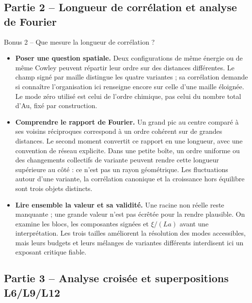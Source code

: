 \documentclass[10pt,a4paper]{article}
\begin{document}
\subsection{Partie 2 -- Longueur de corrélation et analyse de Fourier}
\begin{oral}{Bonus 2 -- Que mesure la longueur de corrélation ?}
\begin{itemize}
\item \textbf{Poser une question spatiale.} Deux configurations de même
énergie ou de même Cowley peuvent répartir leur ordre sur des distances
différentes. Le champ signé par maille distingue les quatre variantes ;
sa corrélation demande si connaître l'organisation ici renseigne encore
sur celle d'une maille éloignée. Le mode zéro utilisé est celui de
l'ordre chimique, pas celui du nombre total d'Au, fixé par construction.
\item \textbf{Comprendre le rapport de Fourier.} Un grand pic au centre
comparé à ses voisins réciproques correspond à un ordre cohérent sur
de grandes distances. Le second moment convertit ce rapport en une
longueur, avec une convention de réseau explicite. Dans une petite
boîte, un ordre uniforme ou des changements collectifs de variante
peuvent rendre cette longueur supérieure au côté : ce n'est pas un
rayon géométrique. Les fluctuations autour d'une variante, la corrélation
canonique et la croissance hors équilibre sont trois objets distincts.
\item \textbf{Lire ensemble la valeur et sa validité.} Une racine non
réelle reste manquante ; une grande valeur n'est pas écrêtée pour la
rendre plausible. On examine les blocs, les composantes signées et
$\xi/(La)$ avant une interprétation. Les trois tailles améliorent la
résolution des modes accessibles, mais leurs budgets et leurs mélanges
de variantes différents interdisent ici un exposant critique fiable.
\end{itemize}
\end{oral}
\subsection{Partie 3 -- Analyse croisée et superpositions L6/L9/L12}
\label{sec:tailles}
\endgroup
\end{document}
